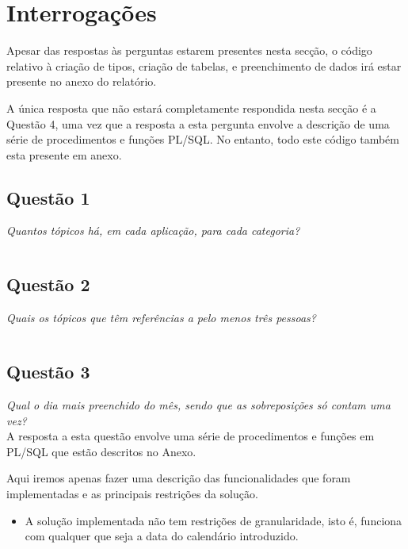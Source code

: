 \documentclass[a4paper,12pt]{article}
\begin{document}
\section{Interrogações}

	Apesar das respostas às perguntas estarem presentes nesta secção, o código relativo à criação de tipos, criação de tabelas, e preenchimento de dados irá estar presente no anexo do relatório.

	A única resposta que não estará completamente respondida nesta secção é a Questão 4, uma vez que a resposta a esta pergunta envolve a descrição de uma série de procedimentos e funções PL/SQL. No entanto, todo este código também esta presente em anexo.

\subsection{Questão 1}

	\emph{Quantos tópicos há, em cada aplicação, para cada categoria?}\\

	\inputminted{sql}{1.sql}

\subsection{Questão 2}

	\emph{Quais os tópicos que têm referências a pelo menos três pessoas?}\\

	\inputminted{sql}{2.sql}

\subsection{Questão 3}

	\emph{Qual o dia mais preenchido do mês, sendo que as sobreposições só contam uma vez?	}\\

	A resposta a esta questão envolve uma série de procedimentos e funções em PL/SQL que estão descritos no Anexo.

	Aqui iremos apenas fazer uma descrição das funcionalidades que foram implementadas e as principais restrições da solução.

	\begin{itemize}
		\item	A solução implementada não tem restrições de granularidade, isto é, funciona com qualquer que seja a data do calendário introduzido. 
	\end{itemize}
	
\end{document}
